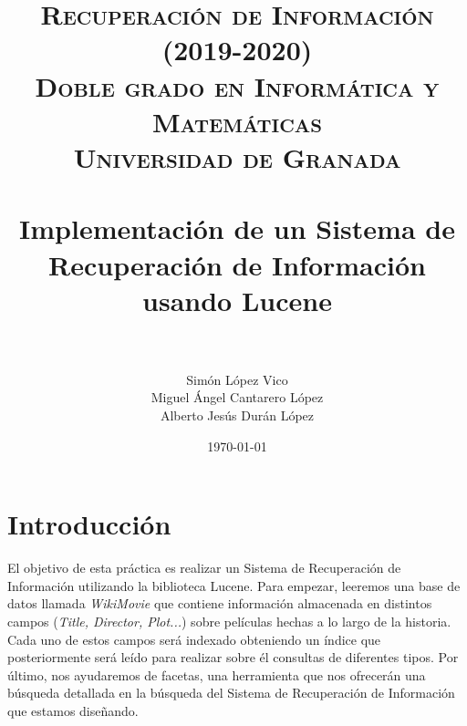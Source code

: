 

\title{	
	\normalfont \normalsize 
	\textsc{\textbf{ Recuperación de Información (2019-2020)} \\ Doble grado en Informática y Matemáticas \\ Universidad de Granada} \\ [25pt] 
	\horrule{0.5pt} \\[0.4cm]
	\huge Implementación de un Sistema de Recuperación de Información usando Lucene  \\ 
	\horrule{2pt} \\[0.5cm] 
}

\author{Simón López Vico \\ Miguel Ángel Cantarero López \\ Alberto Jesús Durán López} 
\date{\normalsize\today}



	\maketitle       %
	\newpage 
	\tableofcontents %
	\newpage
	
\section{Introducción}

El objetivo de esta práctica es realizar un Sistema de Recuperación de Información utilizando la biblioteca Lucene. Para empezar, leeremos una base de datos llamada \textit{WikiMovie} que contiene información almacenada en distintos campos (\textit{Title, Director, Plot...}) sobre películas hechas a lo largo de la historia. Cada uno de estos campos será indexado obteniendo un índice que posteriormente será leído para realizar sobre él consultas de diferentes tipos. Por último, nos ayudaremos de facetas, una herramienta que nos ofrecerán  una búsqueda detallada en la búsqueda del Sistema de Recuperación de Información que estamos diseñando.\\


